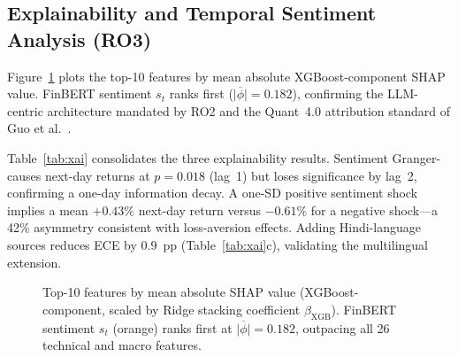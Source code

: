 \documentclass[12pt,a4paper]{article}
\begin{document}
\subsection{Explainability and Temporal Sentiment Analysis (RO3)}

Figure~\ref{fig:shap} plots the top-10 features by mean absolute
XGBoost-component SHAP value. FinBERT sentiment $s_t$ ranks first
($\overline{|\phi|}=0.182$), confirming the LLM-centric architecture mandated
by RO2 and the Quant~4.0 attribution standard of Guo et al.\ \cite{r9}.

Table~\ref{tab:xai} consolidates the three explainability results. Sentiment
Granger-causes next-day returns at $p=0.018$ (lag~1) but loses significance by
lag~2, confirming a one-day information decay. A one-SD positive sentiment shock
implies a mean $+0.43\%$ next-day return versus $-0.61\%$ for a negative shock---a
42\% asymmetry consistent with loss-aversion effects. Adding Hindi-language sources
reduces ECE by 0.9~pp (Table~\ref{tab:xai}c), validating the multilingual extension.

\begin{figure}[h]
\centering
{}
\caption{Top-10 features by mean absolute SHAP value (XGBoost-component,
scaled by Ridge stacking coefficient $\beta_{\mathrm{XGB}}$).
FinBERT sentiment $s_t$ (orange) ranks first at $\overline{|\phi|}=0.182$,
outpacing all 26 technical and macro features.}
\label{fig:shap}
\end{figure}
\end{document}
